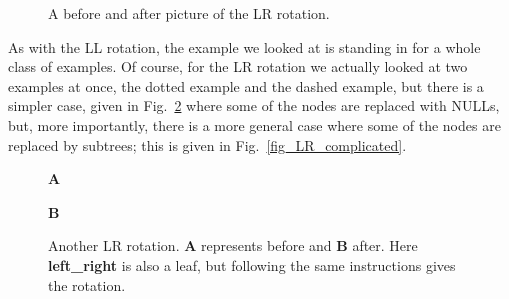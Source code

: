 \documentclass[11pt,a4paper]{scrartcl}
\begin{document}
\begin{figure}
\begin{center}
\qquad
{}
\end{center}
\caption{A before and after picture of the LR rotation.\label{fig_LR_4}}
\end{figure}



As with the LL rotation, the example we looked at is standing in for a
whole class of examples. Of course, for the LR rotation we actually
looked at two examples at once, the dotted example and the dashed
example, but there is a simpler case, given in
Fig.~\ref{fig_LR_simple} where some of the nodes are replaced with
NULLs, but, more importantly, there is a more general case where some
of the nodes are replaced by subtrees; this is given in
Fig.~\ref{fig_LR_complicated}.


\begin{figure}
\textbf{A}
\begin{center}
\end{center}
\textbf{B}
\begin{center}
\end{center}
\caption{Another LR rotation. \textbf{A} represents before and \textbf{B}
  after. Here \textbf{left\_right} is also a leaf, but following the same
  instructions gives the rotation.\label{fig_LR_simple}}
\end{figure}
\end{document}
